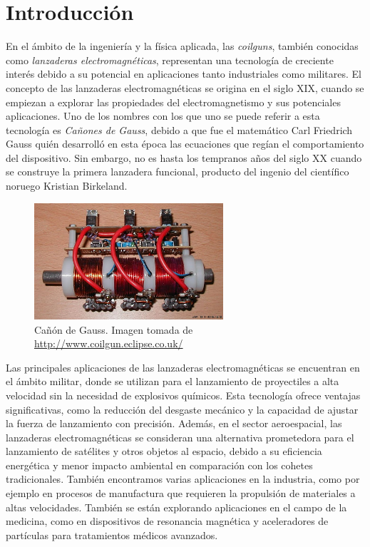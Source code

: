 \section{Introducción}
\label{sec:introduccion}

En el ámbito de la ingeniería y la física aplicada, las \textit{coilguns}, también conocidas como \textit{lanzaderas electromagnéticas}, representan una tecnología de creciente interés debido a su potencial en aplicaciones tanto industriales como militares. El concepto de las lanzaderas electromagnéticas se origina en el siglo XIX, cuando se empiezan a explorar las propiedades del electromagnetismo y sus potenciales aplicaciones. Uno de los nombres con los que uno se puede referir a esta tecnología es \textit{Cañones de Gauss}, debido a que fue el matemático Carl Friedrich Gauss quién desarrolló en esta época las ecuaciones que regían el comportamiento del dispositivo. Sin embargo, no es hasta los tempranos años del siglo XX cuando se construye la primera lanzadera funcional, producto del ingenio del científico noruego Kristian Birkeland.\citep{introCoilGun}

\begin{figure}[h]
    \centering
    \includegraphics[width=7cm]{FigurasMemoria/fig1coilgunIntro.jpeg}
    \caption{Cañón de Gauss. Imagen tomada de \href{URL}{http://www.coilgun.eclipse.co.uk/}}
    \label{fig:prototipolanzadera} %
\end{figure}

Las principales aplicaciones de las lanzaderas electromagnéticas se encuentran en el ámbito militar, donde se utilizan para el lanzamiento de proyectiles a alta velocidad sin la necesidad de explosivos químicos. Esta tecnología ofrece ventajas significativas, como la reducción del desgaste mecánico y la capacidad de ajustar la fuerza de lanzamiento con precisión. Además, en el sector aeroespacial, las lanzaderas electromagnéticas se consideran una alternativa prometedora para el lanzamiento de satélites y otros objetos al espacio, debido a su eficiencia energética y menor impacto ambiental en comparación con los cohetes tradicionales. También encontramos varias aplicaciones en la industria, como por ejemplo en procesos de manufactura que requieren la propulsión de materiales a altas velocidades. También se están explorando aplicaciones en el campo de la medicina, como en dispositivos de resonancia magnética y aceleradores de partículas para tratamientos médicos avanzados. \citep{inproceedings}

